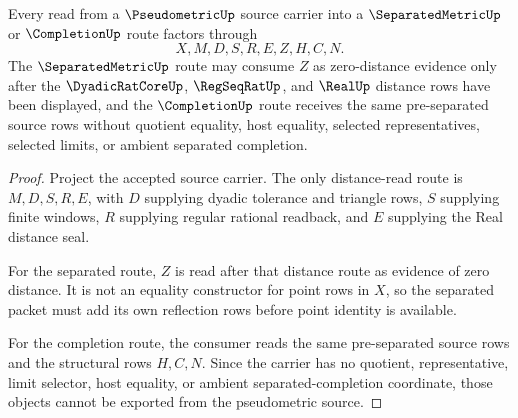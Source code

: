 \begin{theorem}
\label{thm:pseudometric-separated-completion-readback}
Every read from a $\PseudometricUp$ source carrier into a $\SeparatedMetricUp$ or $\CompletionUp$ route factors through
$$
X,M,D,S,R,E,Z,H,C,N .
$$
The $\SeparatedMetricUp$ route may consume $Z$ as zero-distance evidence only after the $\DyadicRatCoreUp$, $\RegSeqRatUp$, and $\RealUp$ distance rows have been displayed, and the $\CompletionUp$ route receives the same pre-separated source rows without quotient equality, host equality, selected representatives, selected limits, or ambient separated completion.
\end{theorem}
\begin{proof}
Project the accepted source carrier. The only distance-read route is $M,D,S,R,E$, with $D$ supplying dyadic tolerance and triangle rows, $S$ supplying finite windows, $R$ supplying regular rational readback, and $E$ supplying the Real distance seal.

For the separated route, $Z$ is read after that distance route as evidence of zero distance. It is not an equality constructor for point rows in $X$, so the separated packet must add its own reflection rows before point identity is available.

For the completion route, the consumer reads the same pre-separated source rows and the structural rows $H,C,N$. Since the carrier has no quotient, representative, limit selector, host equality, or ambient separated-completion coordinate, those objects cannot be exported from the pseudometric source.
\end{proof}

